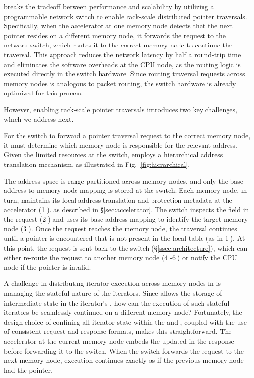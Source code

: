 \pulse breaks the tradeoff between performance and scalability by utilizing a programmable network switch to enable rack-scale distributed pointer traversals. Specifically, when the \pulse accelerator at one memory node detects that the next pointer resides on a different memory node, it forwards the request to the network switch, which routes it to the correct memory node to continue the traversal. This approach reduces the network latency by half a round-trip time and eliminates the software overheads at the CPU node, as the routing logic is executed directly in the switch hardware. Since routing traversal requests across memory nodes is analogous to packet routing, the switch hardware is already optimized for this process.

However, enabling rack-scale pointer traversals introduces two key challenges, which we address next.

 For the switch to forward a pointer traversal request to the correct memory node, it must determine which memory node is responsible for the relevant address. Given the limited resources at the switch, \pulse employs a hierarchical address translation mechanism, as illustrated in Fig.~\ref{fig:hierarchical}. 

The address space is range-partitioned across memory nodes, and only the base address-to-memory node mapping is stored at the switch. Each memory node, in turn, maintains its local address translation and protection metadata at the accelerator (\textcircled{1}), as described in \S\ref{sec:accelerator}. The switch inspects the  field in the request (\textcircled{2}) and uses its base address mapping to identify the target memory node (\textcircled{3}). Once the request reaches the memory node, the traversal continues until a pointer is encountered that is not present in the local table (as in \textcircled{1}). At this point, the request is sent back to the switch (\S\ref{ssec:architecture}), which can either re-route the request to another memory node (\textcircled{4}-\textcircled{6}) or notify the CPU node if the pointer is invalid.

 A challenge in distributing iterator execution across memory nodes in \pulse is managing the stateful nature of the iterators. Since \pulse allows the storage of intermediate state in the iterator's , how can the execution of such stateful iterators be seamlessly continued on a different memory node? Fortunately, the design choice of confining all iterator state within the  and , coupled with the use of consistent request and response formats, makes this straightforward. The accelerator at the current memory node embeds the updated  in the response before forwarding it to the switch. When the switch forwards the request to the next memory node, execution continues exactly as if the previous memory node had the pointer.





